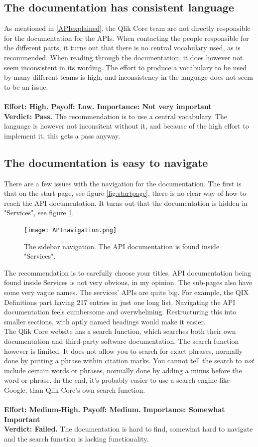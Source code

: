 \documentclass{cslthse-msc}
\begin{document}
    \subsection{The documentation has consistent language}
    As mentioned in \ref{APIexplained}, the Qlik Core team are not directly responsible for the documentation for the APIs. When contacting the people responsible for the different parts, it turns out that there is no central vocabulary used, as is recommended. When reading through the documentation, it does however not seem inconsistent in its wording. The effort to produce a vocabulary to be used by many different teams is high, and inconsistency in the language does not seem to be an issue. \\ \\
    \textbf{Effort: High. Payoff: Low. Importance: Not very important}\\
    \textbf{Verdict: Pass.} The recommendation is to use a central vocabulary. The language is however not inconsitent without it, and because of the high effort to implement it, this gets a pass anyway.
    \subsection{The documentation is easy to navigate}
    There are a few issues with the navigation for the documentation. The first is that on the start page, see figure \ref{fig:startpage}, there is no clear way of how to reach the API documentation. It turns out that the documentation is hidden in "Services", see figure \ref{fig:navgiation}.
    \begin{figure}[H]
        \centering
        \texttt{[image: APInavigation.png]}
        \caption{The sidebar navigation. The API documentation is found inside "Services".}
        \label{fig:navgiation}
    \end{figure}
    The recommendation is to carefully choose your titles. API documentation being found inside Services is not very obvious, in my opinion. The sub-pages also have some very vague names. The services' APIs are quite big. For example, the QIX Definitions part having 217 entries in just one long list. Navigating the API documentation feels cumbersome and overwhelming. Restructuring this into smaller sections, with aptly named headings would make it easier.\\
    The Qlik Core website has a search function, which searches both their own documentation and third-party software documentation. The search function however is limited. It does not allow you to search for exact phrases, normally done by putting a phrase within citation marks. You cannot tell the search to \textit{not} include certain words or phrases, normally done by adding a minus before the word or phrase. In the end, it's probably easier to use a search engine like Google, than Qlik Core's own search function.\\\\
    \textbf{Effort: Medium-High. Payoff: Medium. Importance: Somewhat Important}\\
    \textbf{Verdict: Failed.} The documentation is hard to find, somewhat hard to navigate and the search function is lacking functionality.
\end{document}
